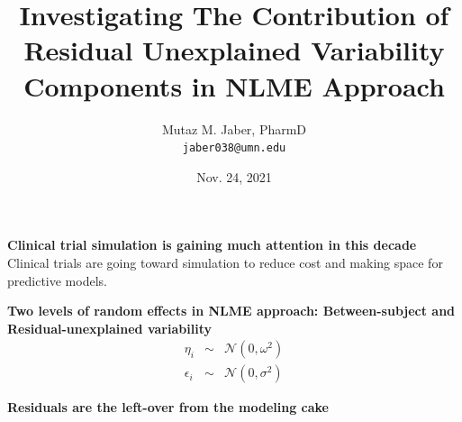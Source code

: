 \documentclass[usepdftitle=false, aspectratio=169]{beamer}
\title
{
    \fontsize{12}{10}\textbf{Investigating The Contribution of Residual Unexplained Variability Components in NLME Approach}
}
\author{Mutaz M. Jaber, PharmD \\ \texttt{jaber038@umn.edu}}
\institute{PhD student, Dept. of Expreimental and Clinical pharmacology}
\date{Nov. 24, 2021}
\begin{document}
\begin{frame}
    \titlepage 
\end{frame}

\begin{frame}
    {\textbf{Clinical trial simulation is gaining much attention in this decade}}
Clinical trials are going toward simulation to reduce cost and making space for predictive models. 
\end{frame}

\begin{frame}
    {\textbf{Two levels of random effects in NLME approach: Between-subject and Residual-unexplained variability}}
    \begin{eqnarray}
        \eta_i &\sim& \mathcal{N}(0, \omega^2)\\
        \epsilon_i &\sim& \mathcal{N}(0, \sigma^2)
    \end{eqnarray}
\end{frame} 
\begin{frame}{\textbf{Residuals are the left-over from the modeling cake}}

\end{frame}
\end{document}
